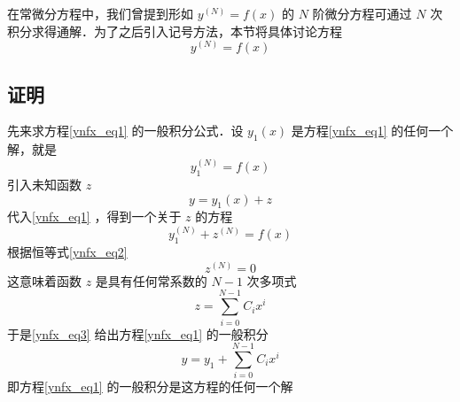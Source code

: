 在常微分方程中，我们曾提到形如 $y^{(N)}=f(x)$ 的 $N$ 阶微分方程可通过 $N$ 次积分求得通解．为了之后引入记号方法，本节将具体讨论方程
\begin{equation}\label{ynfx_eq1}
y^{(N)}=f(x)
\end{equation}


\subsection{证明}
先来求方程\autoref{ynfx_eq1} 的一般积分公式．设 $y_1(x)$ 是方程\autoref{ynfx_eq1} 的任何一个解，就是
\begin{equation}\label{ynfx_eq2}
y_1^{(N)}=f(x)
\end{equation}
引入未知函数 $z$
\begin{equation}\label{ynfx_eq3}
y=y_1(x)+z
\end{equation}
代入\autoref{ynfx_eq1} ，得到一个关于 $z$ 的方程
\begin{equation}
y_1^{(N)}+z^{(N)}=f(x)
\end{equation}
根据恒等式\autoref{ynfx_eq2} 
\begin{equation}
z^{(N)}=0
\end{equation}
这意味着函数 $z$ 是具有任何常系数的 $N-1$ 次多项式
\begin{equation}
z=\sum_{i=0}^{N-1}C_ix^i
\end{equation}
于是\autoref{ynfx_eq3} 给出方程\autoref{ynfx_eq1} 的一般积分
\begin{equation}
y=y_1+\sum_{i=0}^{N-1}C_ix^i
\end{equation}
即方程\autoref{ynfx_eq1} 的一般积分是这方程的任何一个解